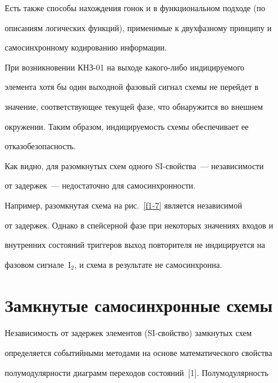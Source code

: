       Есть также способы нахождения гонок и в функциональном подходе (по 


описаниям логических функций), применимые к двухфазному принципу и 


самосинхронному кодированию информации.


      


      При возникновении КНЗ-01 на выходе какого-либо индицируемого 


элемента хотя бы один выходной фазовый сигнал схемы не перейдет в 


значение, соответствующее текущей фазе, что обнаружится во внешнем 


окружении. Таким образом, индицируемость схемы обеспечивает ее 


отказобезопасность.


      


      Как видно, для разомкнутых схем одного SI-свойства~--- независимости 


от задержек~--- недостаточно для самосинхронности.


      


      Например, разомкнутая схема на рис.~\ref{f1-7} является независимой 


от задержек. Однако в спейсерной фазе при некоторых значениях входов и 


внутренних состояний триггеров выход повторителя не индицируется на 


фазовом сигнале~I$_2$, и схема в результате не самосинхронна.


      





      


      \section{Замкнутые самосинхронные схемы}


      


      Независимость от задержек элементов (SI-свойство) замкнутых схем 


определяется событийными методами на основе математического свойства 


полумодулярности диаграмм переходов состояний~[1]. Полумодулярность 


